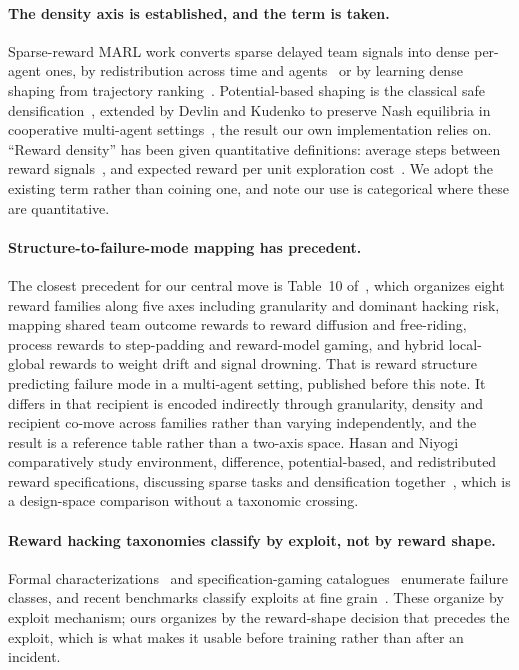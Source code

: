 \documentclass[11pt]{article}
\begin{document}
\paragraph{The density axis is established, and the term is taken.} Sparse-reward MARL work converts sparse delayed team signals into dense per-agent ones, by redistribution across time and agents~\cite{ata} or by learning dense shaping from trajectory ranking~\cite{arms}. Potential-based shaping is the classical safe densification~\cite{ng1999}, extended by Devlin and Kudenko to preserve Nash equilibria in cooperative multi-agent settings~\cite{devlin}, the result our own implementation relies on. ``Reward density'' has been given quantitative definitions: average steps between reward signals~\cite{practitioner}, and expected reward per unit exploration cost~\cite{acl2026}. We adopt the existing term rather than coining one, and note our use is categorical where these are quantitative.

\paragraph{Structure-to-failure-mode mapping has precedent.} The closest precedent for our central move is Table~10 of~\cite{orch}, which organizes eight reward families along five axes including granularity and dominant hacking risk, mapping shared team outcome rewards to reward diffusion and free-riding, process rewards to step-padding and reward-model gaming, and hybrid local-global rewards to weight drift and signal drowning. That is reward structure predicting failure mode in a multi-agent setting, published before this note. It differs in that recipient is encoded indirectly through granularity, density and recipient co-move across families rather than varying independently, and the result is a reference table rather than a two-axis space. Hasan and Niyogi comparatively study environment, difference, potential-based, and redistributed reward specifications, discussing sparse tasks and densification together~\cite{hasan}, which is a design-space comparison without a taxonomic crossing.

\paragraph{Reward hacking taxonomies classify by exploit, not by reward shape.} Formal characterizations~\cite{skalse} and specification-gaming catalogues~\cite{krakovna} enumerate failure classes, and recent benchmarks classify exploits at fine grain~\cite{trace}. These organize by exploit mechanism; ours organizes by the reward-shape decision that precedes the exploit, which is what makes it usable before training rather than after an incident.
\end{document}
